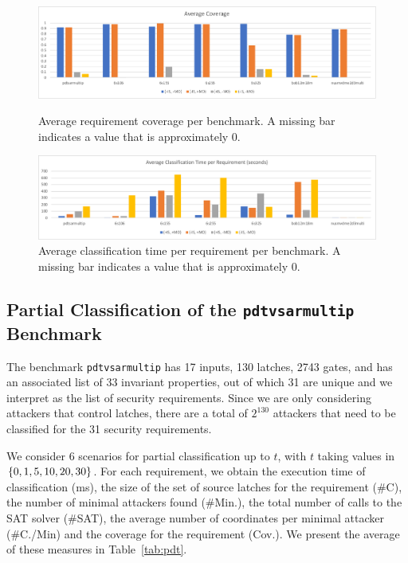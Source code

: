 {\begin{figure}[!t]
\centering
\includegraphics[width=\textwidth]{AverageCoverage}
\caption{Average requirement coverage per benchmark. A missing bar indicates a value that is approximately 0.}
\label{fig:AverageCoverage}
\vspace{0.5cm}
\includegraphics[width=\textwidth]{AverageExecutionTime}
\caption{Average classification time per requirement per benchmark. A missing bar indicates a value that is approximately 0. }
\label{fig:AverageExecTime}
\end{figure}

\subsection{Partial Classification of the \texttt{pdtvsarmultip} Benchmark}
The benchmark \texttt{pdtvsarmultip} has 17 inputs, %
130 latches, %
2743 gates, %
and has an associated list of 33 invariant properties, out of which 31 are unique and we interpret as the list of security requirements. 
Since we are only considering attackers that control latches, there are a total of $2^{130}$ attackers that need to be classified for the 31 security requirements.

We consider 6 scenarios for partial classification up to $t$, with $t$ taking values in $\left\{0,1,5,10,20,30\right\}$. For each requirement, we obtain the execution time of classification (ms), the size of the set of source latches for the requirement (\#C), the number of minimal attackers found (\#Min.), the total number of calls to the SAT solver (\#SAT), the average number of coordinates per minimal attacker (\#C./Min) and the coverage for the requirement (Cov.). We present the average of these measures in Table~\ref{tab:pdt}. 

}
